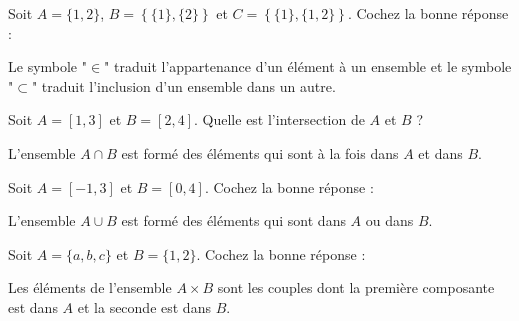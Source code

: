 \begin{question}

Soit $A=\{1,2\}$, $B=\left\{\{1\},\{2\}\right\}$ et $C=\left\{\{1\},\{1,2\}\right\}$. Cochez la bonne réponse :
\begin{answers}  
\end{answers}
\begin{explanations}
Le symbole "$\in$" traduit l'appartenance d'un élément à un ensemble et le symbole "$\subset$" traduit l'inclusion d'un ensemble dans un autre.
\end{explanations}
\end{question}


\begin{question}

Soit $A=[1,3]$ et $B=[2,4]$. Quelle est l'intersection de $A$ et $B$ ?
\begin{answers}  
\end{answers}
\begin{explanations}
L'ensemble $A\cap B$ est formé des éléments qui sont à la fois dans $A$ et dans $B$.
\end{explanations}
\end{question}


\begin{question}

Soit $A=[-1,3]$ et $B=[0,4]$. Cochez la bonne réponse :
\begin{answers}  
\end{answers}
\begin{explanations}
L'ensemble $A\cup B$ est formé des éléments qui sont dans $A$ ou dans $B$.
\end{explanations}
\end{question}


\begin{question}
Soit $A=\{a,b,c\}$ et $B=\{1,2\}$. Cochez la bonne réponse :
\begin{answers}  
\end{answers}
\begin{explanations}
Les éléments de l'ensemble $A\times B$ sont les couples dont la première composante est dans $A$ et la seconde est dans $B$.
\end{explanations}
\end{question}


